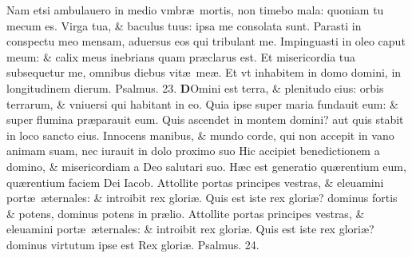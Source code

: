 \documentclass[a5paper,10pt]{book}
\def\ae{æ}
\begin{document}
\begin{multicols*}{2}
\newline \color{red} N\color{black}am etsi ambulauero in medio vmbr\ae \ mortis, non timebo mala: quoniam tu mecum es.%
\newline \color{red} V\color{black}irga tua, \& baculus tuus: ipsa me consolata sunt.
\newline \color{red} P\color{black}arasti in conspectu meo mensam, aduersus eos qui tribulant me.
\newline \color{red} I\color{black}mpinguasti in oleo caput meum: \& calix meus inebrians quam pr\ae clarus est.
\newline \color{red} E\color{black}t misericordia tua subsequetur me, omnibus diebus vit\ae \ me\ae .
\newline \color{red} E\color{black}t vt inhabitem in domo domini, in longitudinem dierum. \quad \color{red} Psalmus. \hypertarget{ps23}{23.} \color{black}
\vspace{-.5em}
\lettrine[lines=2]{\bfseries \color{red} D}{}Omini est terra, \& plenitudo eius: orbis terrarum, \& vniuersi qui habitant in eo.
\newline \color{red} Q\color{black}uia ipse super maria fundauit eum: \& super flumina pr\ae parauit eum.
\newline \color{red} Q\color{black}uis ascendet in montem domini? aut quis stabit in loco sancto eius.
\newline \color{red} I\color{black}nnocens manibus, \& mundo corde, qui non accepit in vano animam suam, nec iurauit in dolo proximo suo %
\newline \color{red} H\color{black}ic accipiet benedictionem a domino, \& misericordiam a Deo salutari suo.
\newline \color{red} H\color{black}\ae c est generatio qu\ae rentium eum, qu\ae rentium faciem Dei Iacob.
\newline \color{red} A\color{black}ttollite portas principes vestras, \& eleuamini port\ae \ \ae ternales: \& introibit rex glori\ae .
\newline \color{red} Q\color{black}uis est iste rex glori\ae ? dominus fortis \& potens, dominus potens in pr\ae lio.
\newline \color{red} A\color{black}ttollite portas principes vestras, \& eleuamini port\ae \ \ae ternales: \& introibit rex glori\ae .
\newline \color{red} Q\color{black}uis est iste rex glori\ae ? dominus virtutum ipse est Rex glori\ae .
\newline \color{red} Psalmus. \hypertarget{ps24}{24.} \color{black}

\end{multicols*}
\end{document}
